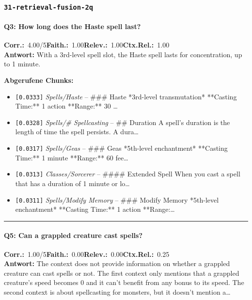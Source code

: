 \subsubsection*{\texttt{31-retrieval-fusion-2q}}
\label{app:samples:31_retrieval_fusion_2q}

\paragraph{Q3: How long does the Haste spell last?}
\noindent \textbf{Corr.:}~4.00/5\quad \textbf{Faith.:}~1.00\quad \textbf{Relev.:}~1.00\quad \textbf{Ctx.Rel.:}~1.00\\

\noindent\textbf{Antwort:} With a 3rd-level spell slot, the Haste spell lasts for concentration, up to 1 minute.

\noindent\textbf{Abgerufene Chunks:}
\begin{itemize}[noitemsep, topsep=2pt]
  \item[\textbf{\#1}] \texttt{[0.0333]} \textit{Spells/Haste} -- \#\#\# Haste  *3rd-level transmutation*  **Casting Time:** 1 action  **Range:** 30 \ldots
  \item[\textbf{\#2}] \texttt{[0.0328]} \textit{Spells/# Spellcasting} -- \#\# Duration  A spell's duration is the length of time the spell persists. A dura\ldots
  \item[\textbf{\#3}] \texttt{[0.0317]} \textit{Spells/Geas} -- \#\#\# Geas  *5th-level enchantment*  **Casting Time:** 1 minute  **Range:** 60 fee\ldots
  \item[\textbf{\#4}] \texttt{[0.0313]} \textit{Classes/Sorcerer} -- \#\#\#\# Extended Spell  When you cast a spell that has a duration of 1 minute or lo\ldots
  \item[\textbf{\#5}] \texttt{[0.0311]} \textit{Spells/Modify Memory} -- \#\#\# Modify Memory  *5th-level enchantment*  **Casting Time:** 1 action  **Range:\ldots
\end{itemize}
\vspace{4pt}
\hrule
\vspace{6pt}

\paragraph{Q5: Can a grappled creature cast spells?}
\noindent \textbf{Corr.:}~1.00/5\quad \textbf{Faith.:}~0.00\quad \textbf{Relev.:}~0.00\quad \textbf{Ctx.Rel.:}~0.25\\

\noindent\textbf{Antwort:} The context does not provide information on whether a grappled creature can cast spells or not. The first context only mentions that a grappled creature's speed becomes 0 and it can't benefit from any bonus to its speed. The second context is about spellcasting for monsters, but it doesn't mention a\ldots

